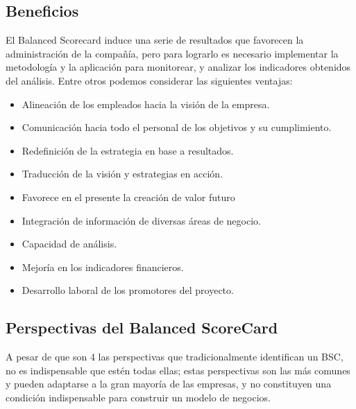 \documentclass[10pt,a4paper]{article}
\begin{document}
			\subsection{Beneficios}
			
			El Balanced Scorecard induce una serie de resultados que favorecen la administración de la compañía, pero para lograrlo es necesario implementar la metodología y la aplicación para monitorear, y analizar los indicadores obtenidos del análisis. Entre otros podemos considerar las siguientes ventajas:
			
			\begin{itemize}
				\item Alineación de los empleados hacia la visión de la empresa.
				\item Comunicación hacia todo el personal de los objetivos y su cumplimiento.
				\item Redefinición de la estrategia en base a resultados.
				\item Traducción de la visión y estrategias en acción.
				\item Favorece en el presente la creación de valor futuro
				\item Integración de información de diversas áreas de negocio.
				\item Capacidad de análisis.
				\item Mejoría en los indicadores financieros.
				\item Desarrollo laboral de los promotores del proyecto.
			\end{itemize}
		
			\subsection{Perspectivas del Balanced ScoreCard}
			
			A pesar de que son 4 las perspectivas que tradicionalmente identifican un BSC, no es indispensable que estén todas ellas; estas perspectivas son las más comunes y pueden adaptarse a la gran mayoría de las empresas, y no constituyen una condición indispensable para construir un modelo de negocios.
			
\end{document}
